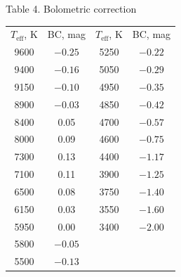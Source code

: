 \begin{center}
Table 4. Bolometric correction

\medskip
\begin{tabular}{cc@{\qquad\qquad}cc}
$T_{\mathrm{eff}}$, K & BC, mag & $T_{\mathrm{eff}}$, K & BC, mag \\
9600 & $-0.25$ & 5250 & $-0.22$ \\
9400 & $-0.16$ & 5050 & $-0.29$ \\
9150 & $-0.10$ & 4950 & $-0.35$ \\
8900 & $-0.03$ & 4850 & $-0.42$ \\
8400 & 0.05 & 4700 & $-0.57$ \\
8000 & 0.09 & 4600 & $-0.75$ \\
7300 & 0.13 & 4400 & $-1.17$ \\
7100 & 0.11 & 3900 & $-1.25$ \\
6500 & 0.08 & 3750 & $-1.40$ \\
6150 & 0.03 & 3550 & $-1.60$ \\
5950 & 0.00 & 3400 & $-2.00$ \\
5800 & $-0.05$ & & \\
5500 & $-0.13$ & & \\
\end{tabular}
\end{center}
